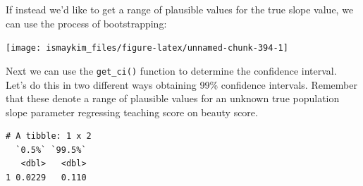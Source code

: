 \documentclass[12pt, krantz2,]{krantz}
\makeatletter
\newenvironment{Shaded}{\begin{snugshade}}{\end{snugshade}}
\newcommand{\DataTypeTok}[1]{\textcolor[rgb]{0.27,0.27,0.27}{#1}}
\newcommand{\DecValTok}[1]{\textcolor[rgb]{0.06,0.06,0.06}{#1}}
\newcommand{\FloatTok}[1]{\textcolor[rgb]{0.06,0.06,0.06}{#1}}
\newcommand{\KeywordTok}[1]{\textcolor[rgb]{0.27,0.27,0.27}{\textbf{#1}}}
\newcommand{\NormalTok}[1]{#1}
\newcommand{\OperatorTok}[1]{\textcolor[rgb]{0.43,0.43,0.43}{\textbf{#1}}}
\newcommand{\StringTok}[1]{\textcolor[rgb]{0.5,0.5,0.5}{#1}}
\newenvironment{kframe}{%
\medskip{}
\setlength{\fboxsep}{.8em}
 \def\at@end@of@kframe{}%
 \ifinner\ifhmode%
  \def\at@end@of@kframe{\end{minipage}}%
  \begin{minipage}{\columnwidth}%
 \fi\fi%
 \def\FrameCommand##1{\hskip\@totalleftmargin \hskip-\fboxsep
 \colorbox{shadecolor}{##1}\hskip-\fboxsep
     \hskip-\linewidth \hskip-\@totalleftmargin \hskip\columnwidth}%
 \MakeFramed {\advance\hsize-\width
   \@totalleftmargin\z@ \linewidth\hsize
   \@setminipage}}%
 {\par\unskip\endMakeFramed%
 \at@end@of@kframe}
\renewenvironment{Shaded}{\begin{kframe}}{\end{kframe}}
\makeatother
\begin{document}
If instead we'd like to get a range of plausible values for the true slope value, we can use the process of bootstrapping:

\begin{Shaded}
\end{Shaded}

\begin{Shaded}
\end{Shaded}

\begin{center}\texttt{[image: ismaykim\_files/figure-latex/unnamed-chunk-394-1]} \end{center}

Next we can use the \texttt{get\_ci()} function to determine the confidence interval. Let's do this in two different ways obtaining 99\% confidence intervals. Remember that these denote a range of plausible values for an unknown true population slope parameter regressing teaching score on beauty score.

\begin{Shaded}
\end{Shaded}

\begin{verbatim}
# A tibble: 1 x 2
  `0.5%` `99.5%`
   <dbl>   <dbl>
1 0.0229   0.110
\end{verbatim}
\end{document}
